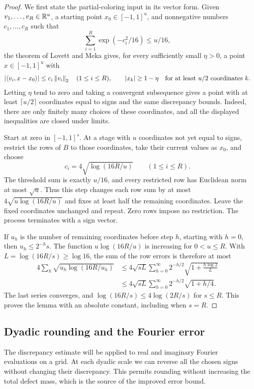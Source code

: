 \begin{proof}
We first state the partial-coloring input in its vector form.  Given
$v_1,\ldots,v_R\in\mathbb R^u$, a starting point $x_0\in[-1,1]^u$, and
nonnegative numbers $c_1,\ldots,c_R$ such that
\[
 \sum_{i=1}^R\exp(-c_i^2/16)\le u/16,
\]
the theorem of Lovett and Meka gives, for every sufficiently small
$\eta>0$, a point $x\in[-1,1]^u$ with
\[
 |\langle v_i,x-x_0\rangle|\le c_i\left\lVert v_i\right\rVert_2
 \quad(1\le i\le R),
 \qquad
 |x_k|\ge1-\eta\quad\text{for at least }u/2\text{ coordinates }k.
\]
Letting $\eta$ tend to zero and taking a convergent subsequence gives a
point with at least $\lceil u/2\rceil$ coordinates equal to signs and the
same discrepancy bounds.  Indeed, there are only finitely many choices
of these coordinates, and all the displayed inequalities are closed
under limits.

Start at zero in $[-1,1]^s$.  At a stage with $u$ coordinates not yet
equal to signs, restrict the rows of $B$ to those coordinates, take their
current values as $x_0$, and choose
\[
 c_i=4\sqrt{\log(16R/u)}\qquad(1\le i\le R).
\]
The threshold sum is exactly $u/16$, and every restricted row has
Euclidean norm at most $\sqrt u$.  Thus this step changes each row sum
by at most $4\sqrt{u\log(16R/u)}$ and fixes at least half the remaining
coordinates.  Leave the fixed coordinates unchanged and repeat.
Zero rows impose no restriction.  The process terminates with a sign
vector.

If $u_h$ is the number of remaining coordinates before step $h$, starting
with $h=0$, then $u_h\le2^{-h}s$.  The function
$u\log(16R/u)$ is increasing for $0<u\le R$.  With
$L=\log(16R/s)\ge\log16$, the sum of the row errors is therefore at most
\[
 \begin{aligned}
 4\sum_h\sqrt{u_h\log(16R/u_h)}
 &\le4\sqrt{sL}\sum_{h=0}^{\infty}2^{-h/2}
       \sqrt{1+\frac{h\log2}{L}}\\
 &\le4\sqrt{sL}\sum_{h=0}^{\infty}2^{-h/2}\sqrt{1+h/4}.
 \end{aligned}
\]
The last series converges, and $\log(16R/s)\le4\log(2R/s)$ for $s\le R$.
This proves the lemma with an absolute constant, including when $s=R$.
\end{proof}

\subsection{Dyadic rounding and the Fourier error}

The discrepancy estimate will be applied to real and imaginary Fourier
evaluations on a grid.  At each dyadic scale we can reverse all the
chosen signs without changing their discrepancy.  This permits rounding
without increasing the total defect mass, which is the source of the
improved error bound.

